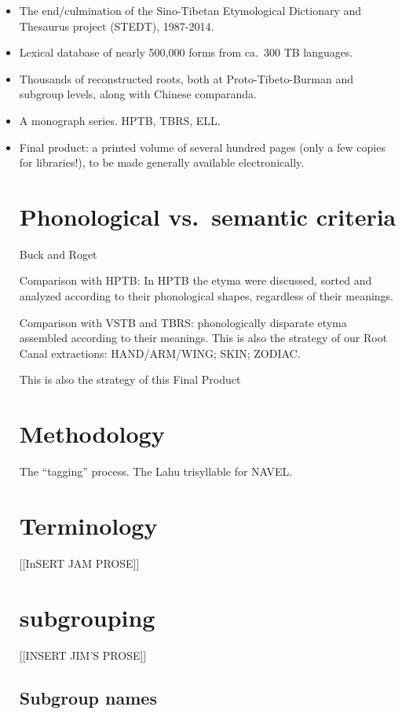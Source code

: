 \begin{itemize}
\item The end/culmination of the Sino-Tibetan Etymological Dictionary and Thesaurus project (STEDT), 1987-2014.
\item Lexical database of nearly 500,000 forms from ca.\ 300 TB languages.
\item Thousands of reconstructed roots, both at Proto-Tibeto-Burman and subgroup levels, along with Chinese comparanda.
\item A monograph series. HPTB, TBRS, ELL.
\item Final product: a printed volume of several hundred pages (only a few copies for libraries!), to be made generally available electronically.

\section{Phonological vs.\ semantic criteria}

Buck and Roget

Comparison with HPTB: In HPTB the etyma were discussed, sorted and analyzed according to their phonological shapes, regardless of their meanings.

Comparison with VSTB and TBRS: phonologically disparate etyma assembled according to their meanings. This is also the strategy of our Root Canal extractions:
HAND/ARM/WING; SKIN; ZODIAC.

This is also the strategy of this Final Product

\section{Methodology}
The ``tagging'' process. The Lahu trisyllable for NAVEL.

\section{Terminology}

[[InSERT JAM PROSE]]

\section{subgrouping}

[[INSERT JIM'S PROSE]]

\subsection{Subgroup names}



\end{itemize}
